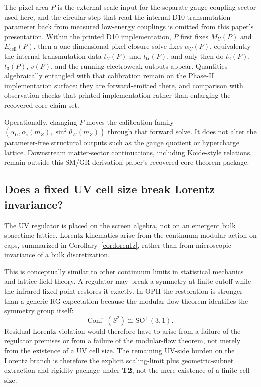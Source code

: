\documentclass[11pt]{article}
\newcommand{\Conf}{\mathrm{Conf}}
\begin{document}
The pixel area \(P\) is the external scale input for the separate gauge-coupling sector used here, and the circular step that read the internal D10 transmutation parameter back from measured low-energy couplings is omitted from this paper's presentation. Within the printed D10 implementation, \(P\) first fixes \(M_U(P)\) and \(E_{\mathrm{cell}}(P)\), then a one-dimensional pixel-closure solve fixes \(\alpha_U(P)\), equivalently the internal transmutation data \(t_U(P)\) and \(t_{\mathrm{tr}}(P)\), and only then do \(t_2(P)\), \(t_3(P)\), \(v(P)\), and the running electroweak outputs appear. Quantities algebraically entangled with that calibration remain on the Phase-II implementation surface: they are forward-emitted there, and comparison with observation checks that printed implementation rather than enlarging the recovered-core claim set.

Operationally, changing \(P\) moves the calibration family \((\alpha_U,\alpha_i(m_Z),\sin^2\theta_W(m_Z))\) through that forward solve. It does not alter the parameter-free structural outputs such as the gauge quotient or hypercharge lattice. Downstream matter-sector continuations, including Koide-style relations, remain outside this SM/GR derivation paper's recovered-core theorem package.

\subsection{Does a fixed UV cell size break Lorentz invariance?}

The UV regulator is placed on the screen algebra, not on an emergent bulk spacetime lattice. Lorentz kinematics arise from the continuum modular action on caps, summarized in Corollary~\ref{cor:lorentz}, rather than from microscopic invariance of a bulk discretization.

This is conceptually similar to other continuum limits in statistical mechanics and lattice field theory. A regulator may break a symmetry at finite cutoff while the infrared fixed point restores it exactly. In OPH the restoration is stronger than a generic RG expectation because the modular-flow theorem identifies the symmetry group itself:
\[
\Conf^+(S^2)\cong \mathrm{SO}^+(3,1).
\]
Residual Lorentz violation would therefore have to arise from a failure of the regulator premises or from a failure of the modular-flow theorem, not merely from the existence of a UV cell size.
The remaining UV-side burden on the Lorentz branch is therefore the explicit scaling-limit plus geometric-subnet extraction-and-rigidity package under \textbf{T2}, not the mere existence of a finite cell size.
\end{document}
